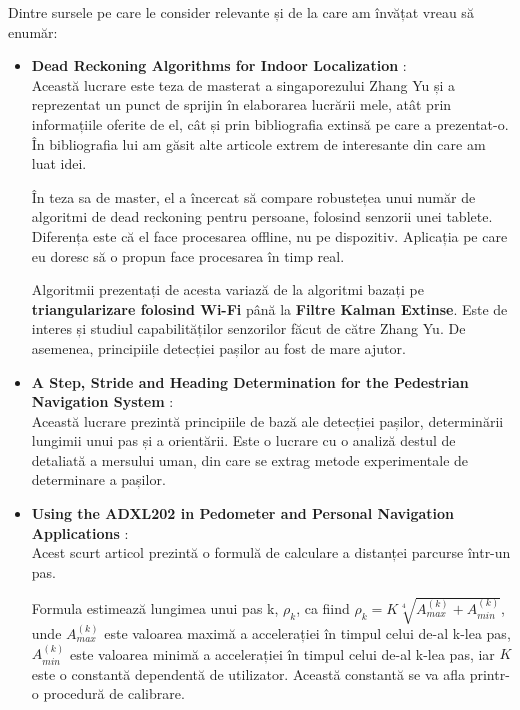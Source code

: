 \documentclass[12pt,a4paper]{article}
\begin{document}
Dintre sursele pe care le consider relevante și de la care am învățat vreau să enumăr:
 
\begin{itemize}  
\item \textbf{Dead Reckoning Algorithms for Indoor Localization} \cite{ZhangYu}:\\
Această lucrare este teza de masterat a singaporezului Zhang Yu și a reprezentat un punct de sprijin în elaborarea lucrării mele, atât prin informațiile oferite de el, cât și prin bibliografia extinsă pe care a prezentat-o. În bibliografia lui am găsit alte articole extrem de interesante din care am luat idei.

În teza sa de master, el a încercat să compare robustețea unui număr de algoritmi de dead reckoning pentru persoane, folosind senzorii unei tablete. Diferența este că el face procesarea offline, nu pe dispozitiv. Aplicația pe care eu doresc să o propun face procesarea în timp real.

Algoritmii prezentați de acesta variază de la algoritmi bazați pe \textbf{triangularizare folosind Wi-Fi} până la \textbf{Filtre Kalman Extinse}. Este de interes și studiul capabilităților senzorilor făcut de către Zhang Yu. De asemenea, principiile detecției pașilor au fost de mare ajutor.

\item \textbf{A Step, Stride and Heading Determination for the Pedestrian
Navigation System} \cite{StepLengthAndHeadingDetermination}:\\
Această lucrare prezintă principiile de bază ale detecției pașilor, determinării lungimii unui pas și a orientării. Este o lucrare cu o analiză destul de detaliată a mersului uman, din care se extrag metode experimentale de determinare a pașilor.

\item \textbf{Using the ADXL202 in Pedometer and Personal Navigation Applications} \cite{HarveyWeinberg}:\\
Acest scurt articol prezintă o formulă de calculare a distanței parcurse într-un pas.

Formula estimează lungimea unui pas k, $\rho_{k}$, ca fiind $\rho_{k} = K \sqrt[4]{A_{max}^{(k)} + A_{min}^{(k)}}$, unde $A_{max}^{(k)}$ este valoarea maximă a accelerației în timpul celui de-al k-lea pas, $A_{min}^{(k)}$ este valoarea minimă a accelerației în timpul celui de-al k-lea pas, iar $K$ este o constantă dependentă de utilizator. Această constantă se va afla printr-o procedură de calibrare.


\end{itemize}
\end{document}
